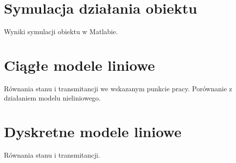 \documentclass[12pt,a4paper,notitlepage]{mwart}
\begin{document}
\pagestyle{fancy}

\section{Symulacja działania obiektu}
Wyniki symulacji obiektu w Matlabie. 

\section{Ciągłe modele liniowe}
Równania stanu i transmitancji we wskazanym punkcie pracy. 
Porównanie z działaniem modelu nieliniowego. 

\section{Dyskretne modele liniowe}
Równania stanu i transmitancji. 
\end{document}
